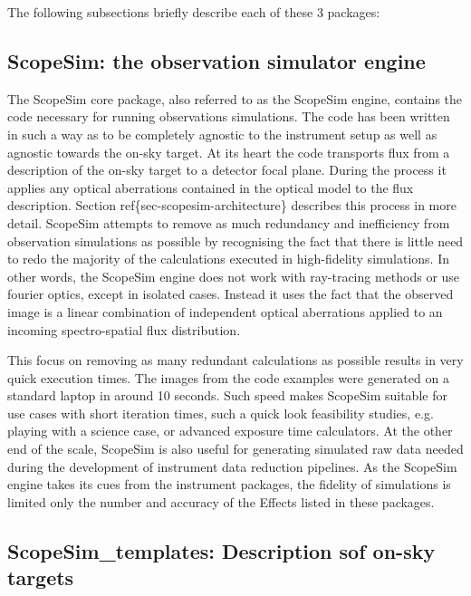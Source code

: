 The following subsections briefly describe each of these 3 packages:


\subsection{ScopeSim: the observation simulator engine%
  \label{scopesim-the-observation-simulator-engine}%
}

The ScopeSim core package, also referred to as the ScopeSim engine, contains the code necessary for running observations simulations.
The code has been written in such a way as to be completely agnostic to the instrument setup as well as agnostic towards the on-sky target.
At its heart the code transports flux from a description of the on-sky target to a detector focal plane.
During the process it applies any optical aberrations contained in the optical model to the flux description.
Section ref\{sec-scopesim-architecture\} describes this process in more detail.
ScopeSim attempts to remove as much redundancy and inefficiency from observation simulations as possible by recognising the fact that there is little need to redo the majority of the calculations executed in high-fidelity simulations.
In other words, the ScopeSim engine does not work with ray-tracing methods or use fourier optics, except in isolated cases.
Instead it uses the fact that the observed image is a linear combination of independent optical aberrations applied to an incoming spectro-spatial flux distribution.

This focus on removing as many redundant calculations as possible results in very quick execution times.
The images from the code examples were generated on a standard laptop in around 10 seconds.
Such speed makes ScopeSim suitable for use cases with short iteration times, such a quick look feasibility studies, e.g. \textquotedbl{}playing\textquotedbl{} with a science case, or advanced exposure time calculators.
At the other end of the scale, ScopeSim is also useful for generating simulated raw data needed during the development of instrument data reduction pipelines.
As the ScopeSim engine takes its cues from the instrument packages, the fidelity of simulations is limited only the number and accuracy of the Effects listed in these packages.


\subsection{ScopeSim\_templates: Description sof on-sky targets%
  \label{scopesim-templates-description-sof-on-sky-targets}%
}

